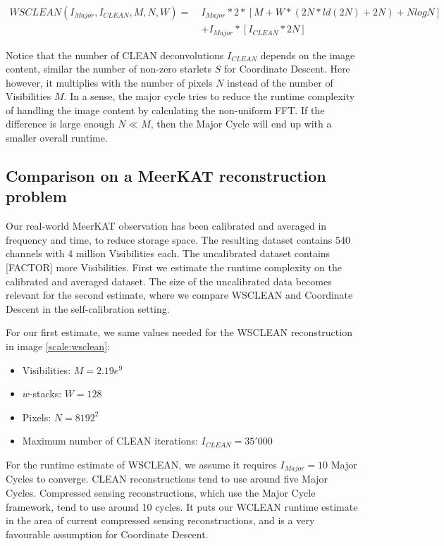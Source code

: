 \begin{equation}\label{results:clean:o}
\begin{aligned}
 WSCLEAN(I_{Major}, I_{CLEAN}, M, N,  W) =\: &I_{Major} * 2 * [M + W*(2N*ld(2N) + 2N) + N log N]\\
	&+ I_{Major} * [I_{CLEAN}*2N]
\end{aligned}
\end{equation}

Notice that the number of CLEAN deconvolutions $I_{CLEAN}$ depends on the image content, similar the number of non-zero starlets $S$ for Coordinate Descent. Here however, it multiplies with the number of pixels $N$ instead of the number of Visibilities $M$. In a sense, the major cycle tries to reduce the runtime complexity of handling the image content by calculating the non-uniform FFT. If the difference is large enough $N \ll M$, then the Major Cycle will end up with a smaller overall runtime.


\subsection{Comparison on a MeerKAT reconstruction problem}
Our real-world MeerKAT observation has been calibrated and averaged in frequency and time, to reduce storage space. The resulting dataset contains 540 channels with 4 million Visibilities each. The uncalibrated dataset contains [FACTOR] more Visibilities. First we estimate the runtime complexity on the calibrated and averaged dataset. The size of the uncalibrated data becomes relevant for the second estimate, where we compare WSCLEAN and Coordinate Descent in the self-calibration setting.

For our first estimate, we same values needed for the WSCLEAN reconstruction in image \ref{scale:wsclean}:
\begin{itemize}
	\item Visibilities: $M=2.19e^9$
	\item $w$-stacks: $W = 128$
	\item Pixels: $N = 8192^2$
	\item Maximum number of CLEAN iterations: $I_{CLEAN} = 35'000$
\end{itemize}

For the runtime estimate of WSCLEAN, we assume it requires $I_{Major}=10$ Major Cycles to converge. CLEAN reconstructions tend to use around five Major Cycles. Compressed sensing reconstructions, which use the Major Cycle framework, tend to use around 10 cycles. It puts our WCLEAN runtime estimate in the area of current compressed sensing reconstructions, and is a very favourable assumption for Coordinate Descent.

